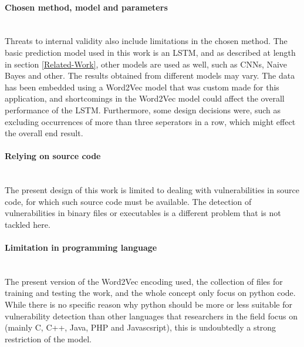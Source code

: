 \documentclass[
	a4paper,
	pagesize,
	pdftex,
	12pt,
	twoside, %
	BCOR=5mm, %
	ngerman,
	fleqn,
	final,
	]{scrartcl}
\begin{document}
\paragraph{Chosen method, model and parameters}\mbox{}\\
Threats to internal validity also include limitations in the chosen method. The basic prediction model used in this work is an LSTM, and as described at length in section \ref{Related-Work}, other models are used as well, such as CNNs, Naive Bayes and other. The results obtained from different models may vary. The data has been embedded using a Word2Vec model that was custom made for this application, and shortcomings in the Word2Vec model could affect the overall performance of the LSTM. Furthermore, some design decisions were, such as excluding occurrences of more than three seperators in a row, which might effect the overall end result.  
\paragraph{Relying on source code}\mbox{}\\
The present design of this work is limited to dealing with vulnerabilities in source code, for which such source code must be available. The detection of vulnerabilities in binary files or executables is a different problem that is not tackled here. 
\paragraph{Limitation in programming language}\mbox{}\\
The present version of the Word2Vec encoding used, the collection of files for training and testing the work, and the whole concept only focus on python code. While there is no specific reason why python should be more or less suitable for vulnerability detection than other languages that researchers in the field focus on (mainly C, C++, Java, PHP and Javascsript), this is undoubtedly a strong restriction of the model.
\end{document}
